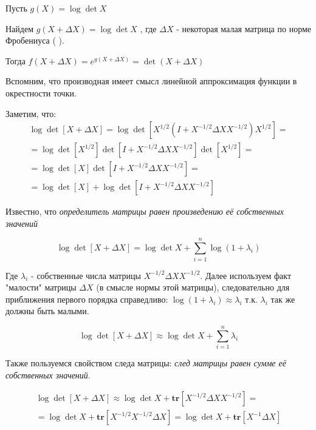 \documentclass[a4paper,12pt]{article}
\newcommand{\D}{\Delta}
\begin{document}
\vspace{\baselineskip}

Пусть $g(X) = \log\det X$

Найдем $g(X + \Delta X) = \log\det X$ , где $\Delta X$ - некоторая малая матрица по норме Фробениуса ( $ $).

Тогда $f(X + \Delta X) = e^{g(X + \Delta X)} = \det (X + \D X)$

\vspace{\baselineskip}

Вспомним, что производная имеет смысл линейной аппроксимация функции в окрестности точки.

Заметим, что:
 \begin{multline}
 \log\det\left[ X+ \Delta X\right] = \log \det \left[ X^{1/2} \left(I + X^{-1/2} \Delta X X^{-1/2}\right)X^{1/2}\right] =\\= \log \det \left[ X^{1/2} \right]\det \left[ I + X^{-1/2} \Delta X X^{-1/2}\right] \det \left[ X^{1/2}\right] =\\= \log \det \left[ X \right]\det \left[ I + X^{-1/2} \Delta X X^{-1/2}\right]=\\= \log \det \left[ X \right] + \log\det \left[ I + X^{-1/2} \Delta X X^{-1/2}\right]
 \end{multline}
 
Известно, что {\it определитель матрицы равен произведению её собственных значений}
 
 $$\log\det\left[ X+ \Delta X\right] = \log\det X + \sum\limits_{i=1}^n \log(1 + \lambda_i)$$
 
Где $\lambda_i$ - собственные числа матрицы $X^{-1/2} \Delta X X^{-1/2}$. Далее используем факт "малости" матрицы $\Delta X$ (в смысле нормы этой матрицы), следовательно для приближения первого порядка справедливо: $\log (1 + \lambda_i) \approx \lambda_i$ т.к. $\lambda_i$ так же должны быть малыми.
 

 $$\log\det\left[ X+ \Delta X\right] \approx \log\det X + \sum\limits_{i=1}^n \lambda_i$$
 
 Также пользуемся свойством следа матрицы: {\it след матрицы равен сумме её собственных значений}.
 
 \begin{multline}\label{eq_log_det}
 \log\det\left[ X+ \Delta X\right] \approx \log\det X + \mathbf{tr}\left[X^{-1/2} \Delta X X^{-1/2}\right] =\\= \log\det X + \mathbf{tr}\left[X^{-1/2} X^{-1/2} \Delta X \right] = \log\det X + \mathbf{tr}\left[X^{-1}\Delta X \right]
 \end{multline}
 
\end{document}
